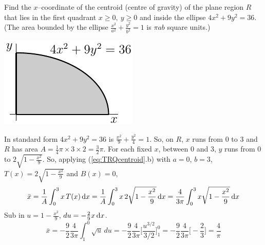 \begin{eg}\label{eq:TRQcentroidA}
 Find the $x$--coordinate of the centroid (centre of gravity)
of the plane region $R$ that lies in the first quadrant $x\ge 0, \ y\ge
0$ and inside the ellipse $4x^2+9y^2=36$. (The area bounded by the ellipse
$\frac{x^2}{a^2}+\frac{y^2}{b^2}=1$ is $\pi ab$ square units.)

\begin{efig}
\begin{center}
    \includegraphics{centroidQuarterEllipse}
\end{center}
\end{efig}

\soln In standard form $4x^2+9y^2=36$ is $\frac{x^2}{9}+\frac{y^2}{4}=1$.
So, on $R$, $x$ runs from $0$ to $3$ and $R$ has area
$A=\frac{1}{4}\pi\times 3\times 2=\frac{3}{2}\pi$. For each fixed $x$,
between $0$ and $3$, $y$ runs from $0$ to $2\sqrt{1-\frac{x^2}{9}}$.
So, applying (\ref{eq:TRQcentroid}.b) with $a=0$, $b=3$,
$T(x)=2\sqrt{1-\frac{x^2}{9}}$ and $B(x)=0$,
\begin{equation*}
\bar x =\frac{1}{A}\int_0^3 x\,T(x)\,\mathrm{d}x
=\frac{1}{A}\int_0^3 x\,2\sqrt{1-\frac{x^2}{9}}\,\mathrm{d}x
=\frac{4}{3\pi}\int_0^3 x\sqrt{1-\frac{x^2}{9}}\,\mathrm{d}x
\end{equation*}
Sub in $u=1-\frac{x^2}{9}$, $du=-\frac{2}{9}x\,\mathrm{d}x$.
\begin{equation*}
\bar x
=-\frac{9}{2}\frac{4}{3\pi}\int_1^0 \sqrt{u}\,du
=-\frac{9}{2}\frac{4}{3\pi}\Big[\frac{u^{3/2}}{3/2}\Big]_1^0
=-\frac{9}{2}\frac{4}{3\pi}\Big[-\frac{2}{3}\Big]
=\frac{4}{
\pi}
\end{equation*}
\end{eg}

